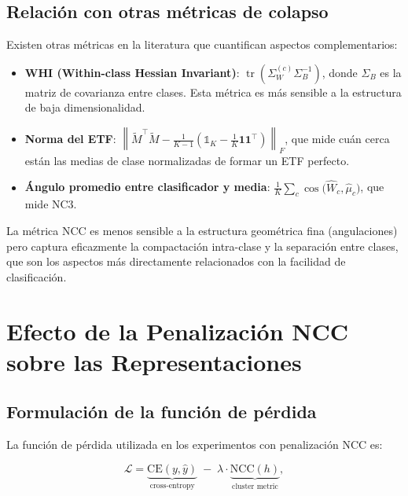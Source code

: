 \documentclass[12pt,a4paper]{report}
\newcommand{\I}{\mathds{1}}
\newcommand{\norm}[1]{\left\lVert#1\right\rVert}
\newcommand{\tr}{\operatorname{tr}}
\newcommand{\NCC}{\text{NCC}}
\newcommand{\CE}{\text{CE}}
\begin{document}
\section{Relación con otras métricas de colapso}

Existen otras métricas en la literatura que cuantifican aspectos complementarios:

\begin{itemize}
    \item \textbf{WHI (Within-class Hessian Invariant)}: $\tr(\Sigma_W^{(c)} \Sigma_{B}^{-1})$, donde $\Sigma_B$ es la matriz de covarianza entre clases. Esta métrica es más sensible a la estructura de baja dimensionalidad.

    \item \textbf{Norma del ETF}: $\norm{\tilde{M}^\top \tilde{M} - \tfrac{1}{K-1}(\I_K - \tfrac{1}{K}\mathbf{1}\mathbf{1}^\top)}_F$, que mide cuán cerca están las medias de clase normalizadas de formar un ETF perfecto.

    \item \textbf{Ángulo promedio entre clasificador y media}: $\frac{1}{K}\sum_c \cos\!\big(\hat{W}_c, \hat{\mu}_c\big)$, que mide NC3.
\end{itemize}

La métrica NCC es menos sensible a la estructura geométrica fina (angulaciones) pero captura eficazmente la compactación intra-clase y la separación entre clases, que son los aspectos más directamente relacionados con la facilidad de clasificación.

\chapter{Efecto de la Penalización NCC sobre las Representaciones}
\label{chap:efecto}

\section{Formulación de la función de pérdida}

La función de pérdida utilizada en los experimentos con penalización NCC es:

\begin{equation}
    \mathcal{L} = \underbrace{\CE(y, \hat{y})}_{\text{cross-entropy}} \;-\; \lambda \cdot \underbrace{\NCC(h)}_{\text{cluster metric}},
\label{eq:loss_ncc}
\end{equation}
\end{document}
